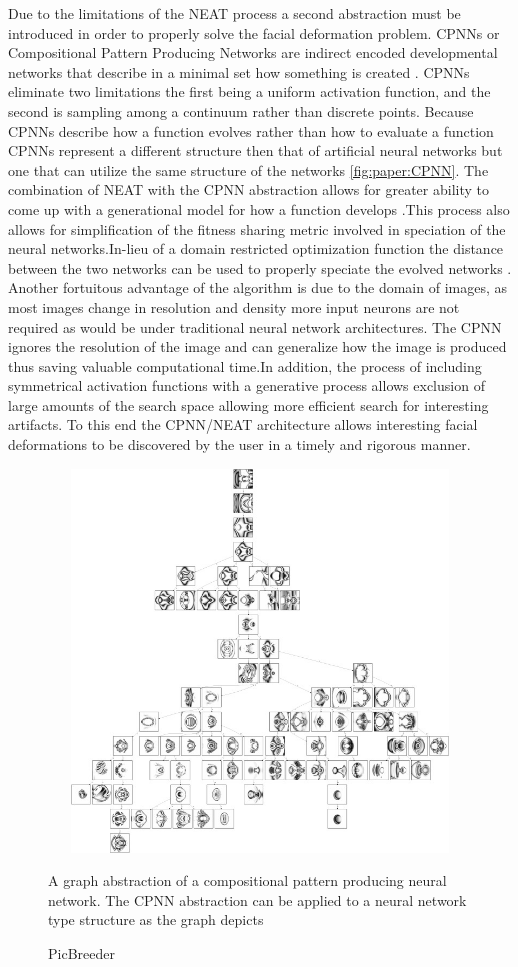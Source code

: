 Due to the limitations of the NEAT process a second abstraction must be introduced in order to properly solve the facial 
deformation problem. CPNNs or Compositional Pattern Producing Networks are indirect encoded developmental networks that 
describe in a minimal set how something is created \cite{stanley2007compositional}. CPNNs eliminate two limitations the first
being a uniform activation function, and the second is sampling among a continuum rather than discrete points. Because CPNNs 
describe how a function evolves rather than how to evaluate a function CPNNs represent a different structure then that of 
artificial neural networks but one that can utilize the same structure of the networks \ref{fig:paper:CPNN}. The combination
of NEAT with the CPNN abstraction allows for greater ability to come up with a generational model for how a function develops
\cite{stanley2007compositional}.This process also allows for simplification of the fitness sharing metric involved in speciation
of the neural networks.In-lieu of a domain restricted optimization function the distance between the two networks can be used
to properly speciate the evolved networks \cite{stanley2007compositional}. Another fortuitous advantage of the algorithm is due
to the domain of images, as most images change in resolution and density more input neurons are not required as would be under
traditional neural network architectures. The CPNN ignores the resolution of the image and can generalize how the image is produced
thus saving valuable computational time.In addition, the process of including symmetrical activation functions with a generative process 
allows exclusion of large amounts of the search space allowing more efficient search for interesting artifacts. To this end the CPNN/NEAT
architecture allows interesting facial deformations to be discovered by the user in a timely and rigorous manner.

\begin{figure}
 \centering
 \label{fig:paper:picbreed}
 \includegraphics[height = 4in, width = 5in]{../../rec/paper/picbreed.jpg}
 \caption{PicBreeder} A graph abstraction of a compositional pattern producing neural network. The CPNN abstraction
 can be applied to a neural network type structure as the graph depicts \cite{stnaleypicbreed}
\end{figure}

